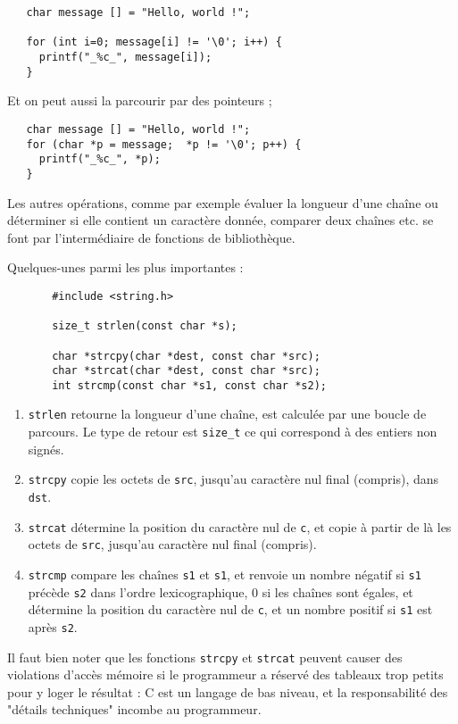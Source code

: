 \documentclass[10pt]{article}
\begin{document}
\begin{verbatim}
   char message [] = "Hello, world !";

   for (int i=0; message[i] != '\0'; i++) {
     printf("_%c_", message[i]);
   }
\end{verbatim}
 
Et on peut aussi la parcourir par des pointeurs ;
\begin{verbatim}
   char message [] = "Hello, world !";
   for (char *p = message;  *p != '\0'; p++) {
     printf("_%c_", *p);
   }
\end{verbatim}

Les autres opérations, comme par exemple évaluer la longueur d'une chaîne ou déterminer si elle contient un caractère donnée, comparer deux chaînes etc. se font par l'intermédiaire de fonctions de bibliothèque.

Quelques-unes parmi les plus importantes :
\begin{verbatim}
       #include <string.h>

       size_t strlen(const char *s);

       char *strcpy(char *dest, const char *src);
       char *strcat(char *dest, const char *src);
       int strcmp(const char *s1, const char *s2);

\end{verbatim}

\begin{enumerate}
\item \texttt{strlen} retourne la longueur d'une chaîne, est
 calculée par une boucle de parcours. Le type de retour est \texttt{size\_t} ce qui correspond à des entiers non signés.
\item \texttt{strcpy} copie les octets de \texttt{src}, jusqu'au caractère nul final (compris), dans \texttt{dst}. 
\item \texttt{strcat} détermine la position du caractère nul de \texttt{c}, et copie à partir de là les octets de \texttt{src}, jusqu'au caractère nul final (compris). 
\item \texttt{strcmp} compare les chaînes \texttt{s1} et \texttt{s1},
 et renvoie un nombre négatif si \texttt{s1} précède \texttt{s2} dans
 l'ordre lexicographique, 0 si les chaînes sont égales, et 
détermine la position du caractère nul de \texttt{c}, et
un nombre positif si \texttt{s1} est après \texttt{s2}.
\end{enumerate}

Il faut bien noter que les fonctions \texttt{strcpy} et
 \texttt{strcat} peuvent causer des violations d'accès mémoire si le
 programmeur a réservé des tableaux trop petits pour y loger le
 résultat : C est un langage de bas niveau, et la responsabilité des
"détails techniques" incombe au programmeur.
\end{document}
